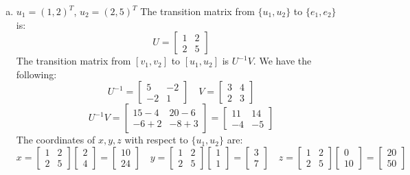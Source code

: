 \documentclass{article}
\begin{document}
\begin{enumerate}[(a)]
    \item
    $u_1 = (1,2)^T$, $u_2 = (2,5)^T$
    The transition matrix from $\{u_1, u_2\}$ to $\{e_1, e_2\}$ is:
    $$ U = \begin{bmatrix} 1 & 2 \\ 2 & 5 \end{bmatrix} $$
    The transition matrix from $[v_1, v_2]$ to $[u_1, u_2]$ is $U^{-1}V$.
    We have the following:
    $$ U^{-1} = \begin{bmatrix} 5 & -2 \\ -2 & 1 \end{bmatrix} \quad
    V = \begin{bmatrix} 3 & 4 \\ 2 & 3 \end{bmatrix} $$
    $$ U^{-1}V = \begin{bmatrix} 15-4 & 20-6 \\ -6+2 & -8+3 \end{bmatrix} = 
    \begin{bmatrix} 11 & 14 \\ -4 & -5 \end{bmatrix} $$
    The coordinates of $x, y, z$ with respect to $\{u_1, u_2\}$ are:
    $$
    x = \begin{bmatrix} 1 & 2 \\ 2 & 5 \end{bmatrix} \begin{bmatrix} 2 \\ 4 \end{bmatrix}
     = \begin{bmatrix} 10 \\ 24 \end{bmatrix}
    \quad
    y = \begin{bmatrix} 1 & 2 \\ 2 & 5 \end{bmatrix} \begin{bmatrix} 1 \\ 1 \end{bmatrix}
     = \begin{bmatrix} 3 \\ 7 \end{bmatrix}
    \quad
    z = \begin{bmatrix} 1 & 2 \\ 2 & 5 \end{bmatrix} \begin{bmatrix} 0 \\ 10 \end{bmatrix}
     = \begin{bmatrix} 20 \\ 50 \end{bmatrix}
$$
\end{enumerate}
\end{document}
